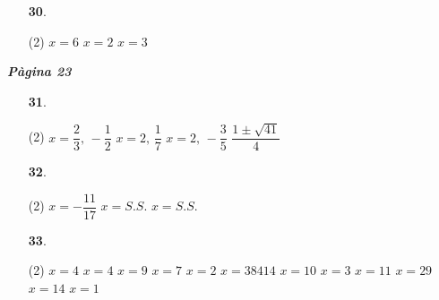 \documentclass[a4paper, pdf, twoside]{book}
\begin{document}
\begin{multicols}{2}
\begin{enumerate}
 \item[\fontfamily{phv}\selectfont\color{blue}\textbf{30}. ] 
 \begin{tasks}[column-sep=1em, item-indent=1.3333em](2)
	 \task $x=6$
	 \task $x=2$
	 \task $x=3$
\end{tasks}
 \end{enumerate}
\vspace{0.3cm}


{\textbf{\em Pàgina 23}} \hrulefill
\begin{enumerate}
\vspace{0.25cm}



 \item[\fontfamily{phv}\selectfont\color{blue}\textbf{31}. ]  \scalebox{0.6}{\simbolclau } 
 \begin{tasks}[column-sep=1em, item-indent=1.3333em](2)
	 \task  $x= \dfrac {2}{3},\,-\dfrac {1}{2}$
	 \task $x=2,\,\dfrac {1}{7}$
	 \task $x=2,\,-\dfrac {3}{5}$
	 \task $\dfrac {1\pm \sqrt {41}}{4}$
\end{tasks}
 \end{enumerate}
\begin{enumerate}
\vspace{0.25cm}



 \item[\fontfamily{phv}\selectfont\color{blue}\textbf{32}. ] 
 \begin{tasks}[column-sep=1em, item-indent=1.3333em](2)
	 \task $x=-\dfrac {11}{17}$
	 \task $x=S.S.$
	 \task $x=S.S.$
\end{tasks}
\vspace{0.25cm}



 \item[\fontfamily{phv}\selectfont\color{blue}\textbf{33}. ]  \scalebox{0.6}{\simbolclau } 
 \begin{tasks}[column-sep=1em, item-indent=1.3333em](2)
	 \task  $x=4$
	 \task $x=4$
	 \task $x=9$
	 \task $x=7$
	 \task $x=2$
	 \task $x=38414$
	 \task $x=10$
	 \task $x=3$
	 \task $x=11$
	 \task $x=29$
	 \task $x=14$
	 \task $x=1$
\end{tasks}
 \end{enumerate}
\vspace{0.3cm}



\end{multicols}
\end{document}
